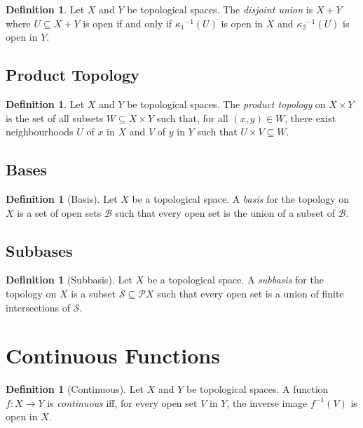 \documentclass{book}
\theoremstyle{definition}
\newtheorem{df}[ax]{Definition}
\newcommand{\inv}[1]{\ensuremath{{#1}^{-1}}}
\begin{document}
\begin{df}
Let $X$ and $Y$ be topological spaces. The \emph{disjoint union} is $X + Y$ where $U \subseteq X + Y$ is open if and only if $\inv{\kappa_1}(U)$ is open in $X$ and $\inv{\kappa_2}(U)$ is open in $Y$.
\end{df}

\subsection{Product Topology}

\begin{df}
Let $X$ and $Y$ be topological spaces. The \emph{product topology} on $X \times Y$ is the set of all subsets $W \subseteq X \times Y$ such that, for all $(x,y) \in W$, there exist neighbourhoods $U$ of $x$ in $X$ and $V$ of $y$ in $Y$ such that $U \times V \subseteq W$.
\end{df}

\subsection{Bases}

\begin{df}[Basis]
Let $X$ be a topological space. A \emph{basis} for the topology on $X$ is a set of open sets $\mathcal{B}$ such that every open set is the union of a subset of $\mathcal{B}$.
\end{df}

\subsection{Subbases}

\begin{df}[Subbasis]
Let $X$ be a topological space. A \emph{subbasis} for the topology on $X$ is a subset $\mathcal{S} \subseteq \mathcal{P} X$ such that every open set is a union of finite intersections of $\mathcal{S}$.
\end{df}

\section{Continuous Functions}

\begin{df}[Continuous]
Let $X$ and $Y$ be topological spaces. A function $f : X \rightarrow Y$ is \emph{continuous} iff, for every open set $V$ in $Y$, the inverse image $\inv{f}(V)$ is open in $X$.
\end{df}
\end{document}
